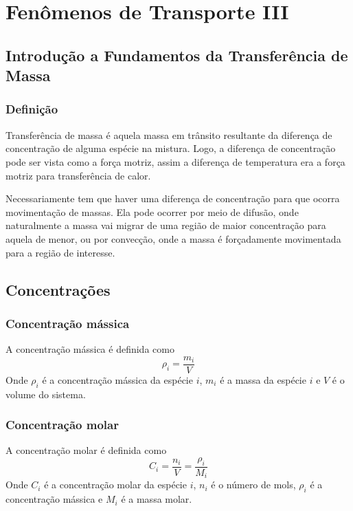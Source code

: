 \chapter{Fenômenos de Transporte III}
\section{Introdução a Fundamentos da Transferência de Massa}
\subsection{Definição}
Transferência de massa é aquela massa em trânsito resultante da diferença de concentração de alguma
espécie na mistura. Logo, a diferença de concentração pode ser vista como a força motriz, assim a
diferença de temperatura era a força motriz para transferência de calor. \par

Necessariamente tem que haver uma diferença de concentração para que ocorra movimentação de massas.
Ela pode ocorrer por meio de difusão, onde naturalmente a massa vai migrar de uma região de maior
concentração para aquela de menor, ou por convecção, onde a massa é forçadamente movimentada para a
região de interesse. \par

\section{Concentrações}
\subsection{Concentração mássica}
A concentração mássica é definida como
\begin{equation}\label{eq:conc_massica}
    \rho_i = \frac{m_i}{V}
\end{equation}
Onde \(\rho _{i} \) é a concentração mássica da espécie \(i\), \(m_i\) é a massa da espécie \(i\) e
\(V\) é o volume do sistema. \par

\subsection{Concentração molar}
A concentração molar é definida como
\begin{equation}\label{eq:conc_molar}
    C_i = \frac{n_i}{V} = \frac{\rho _i}{M_i}
\end{equation}
Onde \(C_i\) é a concentração molar da espécie \(i\), \(n_i\) é o número de mols, \(\rho _{i} \) é a
concentração mássica e \(M_{i} \) é a massa molar. \par
